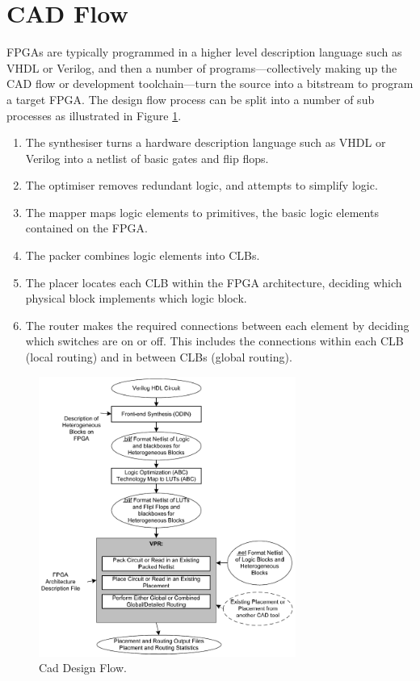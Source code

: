\documentclass[12pt,final,oneside]{memoir} %
\begin{document}
\section{\acs{CAD} Flow}
\acp{FPGA} are typically programmed in a higher level description language such as VHDL or Verilog, and then a number of programs---collectively making up the \ac{CAD} flow or development toolchain---turn the source into a bitstream to program a target \ac{FPGA}.
The design flow process can be split into a number of sub processes as illustrated in Figure \ref{CADFlow}\cite{VPRBook,VPRManual,FPGAArch}.
\begin{enumerate}
    \item The synthesiser turns a hardware description language such as VHDL or Verilog into a netlist of basic gates and flip flops.
    \item The optimiser removes redundant logic, and attempts to simplify logic.
    \item The mapper maps logic elements to primitives, the basic logic elements contained on the \ac{FPGA}.
    \item The packer combines logic elements into \acp{CLB}.
    \item The placer locates each \ac{CLB} within the \ac{FPGA} architecture, deciding which physical block implements which logic block.
    \item The router makes the required connections between each element by deciding which switches are on or off. This includes the connections within each \ac{CLB} (local routing) and in between \acp{CLB} (global routing).
\end{enumerate}

\begin{figure}
    \begin{center}
        \includegraphics[width=0.75\textwidth]{images/vpr-cad.png}
        \caption{Cad Design Flow.\cite{VPRManual}}
        \label{CADFlow}
    \end{center}
\end{figure}
\end{document}
